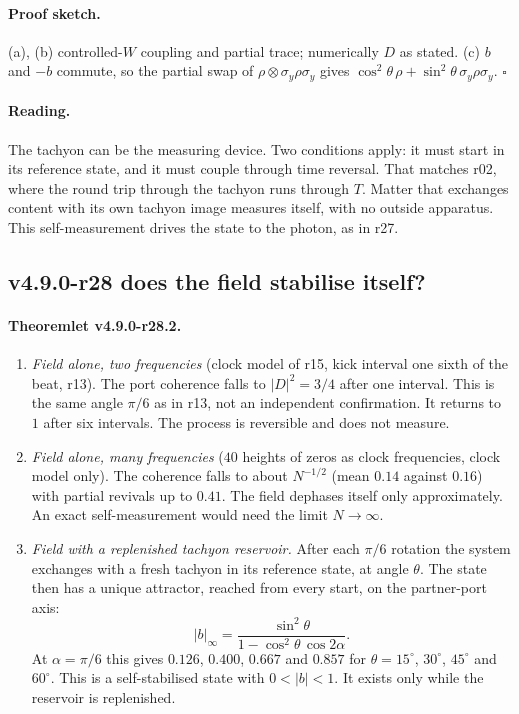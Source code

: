 \paragraph{Proof sketch.}
(a), (b) controlled-\(W\) coupling and partial trace; numerically \(D\) as stated.  (c) \(b\) and \(-b\) commute, so the partial swap of
\(\rho\otimes\sigma_y\rho\sigma_y\) gives \(\cos^2\theta\,\rho+\sin^2\theta\,\sigma_y\rho\sigma_y\).  \(\square\)

\paragraph{Reading.}
The tachyon can be the measuring device.  Two conditions apply: it must start in its reference state, and it must couple through
time reversal.  That matches r02, where the round trip through the tachyon runs through \(T\).  Matter that exchanges content with
its own tachyon image measures itself, with no outside apparatus.  This self-measurement drives the state to the photon, as in r27.

\subsection*{v4.9.0-r28 does the field stabilise itself?}
\label{subsec:v490-r28-self-stabilisation}

\paragraph{Theoremlet v4.9.0-r28.2.}
\begin{enumerate}[leftmargin=2em]
\item[(a)] \emph{Field alone, two frequencies} (clock model of r15, kick interval one sixth of the beat, r13).  The port coherence falls
to \(|D|^2=3/4\) after one interval.  This is the same angle \(\pi/6\) as in r13, not an independent confirmation.  It returns to \(1\) after
six intervals.  The process is reversible and does not measure.
\item[(b)] \emph{Field alone, many frequencies} (\(40\) heights of zeros as clock frequencies, clock model only).  The coherence falls to
about \(N^{-1/2}\) (mean \(0.14\) against \(0.16\)) with partial revivals up to \(0.41\).  The field dephases itself only approximately.  An
exact self-measurement would need the limit \(N\to\infty\).
\item[(c)] \emph{Field with a replenished tachyon reservoir.}  After each \(\pi/6\) rotation the system exchanges with a fresh tachyon in its
reference state, at angle \(\theta\).  The state then has a unique attractor, reached from every start, on the partner-port axis:
\[
|b|_\infty=\frac{\sin^2\theta}{1-\cos^2\theta\,\cos2\alpha}.
\]
At \(\alpha=\pi/6\) this gives \(0.126\), \(0.400\), \(0.667\) and \(0.857\) for \(\theta=15^\circ\), \(30^\circ\), \(45^\circ\) and \(60^\circ\).  This is a self-stabilised state with \(0<|b|<1\).  It exists only while the reservoir is replenished.
\end{enumerate}

